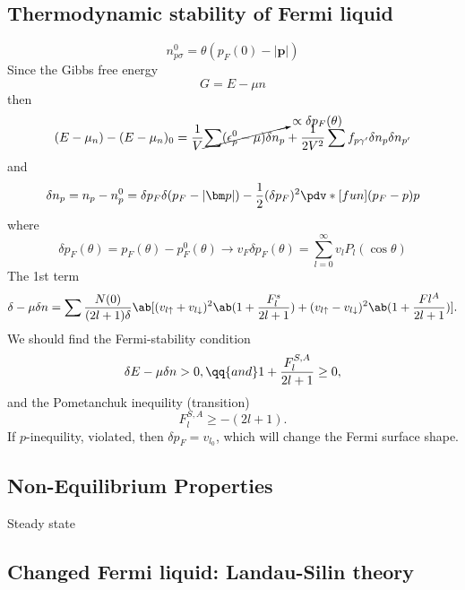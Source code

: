 \subsection{Thermodynamic stability of Fermi liquid}

\begin{equation}
  n_{p\sigma}^0 = \theta(p_F(0) - |\bm p|)
\end{equation}
Since the Gibbs free energy
\begin{equation}
  G = E - \mu n
\end{equation}
then
\begin{equation}
  (E - \mu_n) - (E - \mu_n)_0
= \frac1V \cancelto{\propto\delta p_F(\theta)}
    {\sum (\epsilon_p^0 - \mu) \delta n_p} +
  \frac1{2V^2} \sum f_{p\gamma'} \delta n_p \delta n_{p'}
\end{equation}
and
\begin{equation}
  \delta n_p = n_p - n_p^0 = \delta p_F \delta(p_F - |\bm p|)
- \frac12(\delta p_F)^2 \pdv*[fun]{(p_F - p)}p
\end{equation}
where
\[
  \delta p_F(\theta) = p_F(\theta) - p_F^0(\theta) \longrightarrow
  v_F\delta p_F(\theta) = \sum_{l=0}^\infty v_l P_l(\cos\theta)
\]
The 1st term
\[
  \delta - \mu \delta n = \sum \frac{N(0)}{(2l + 1) \delta}
  \ab[(v_{l\uparrow} + v_{l\downarrow})^2 \ab(1 + \frac{F_l^s}{2l + 1})
    + (v_{l\uparrow} - v_{l\downarrow})^2 \ab(1 + \frac{Fl^A}{2l + 1})].
\]
We should find the Fermi-stability condition
\begin{equation}
  \delta E - \mu\delta n > 0, \qq{and}
  1 + \frac{F_l^{S,A}}{2l + 1} \geq 0,
\end{equation}
and the Pometanchuk inequility (transition)
\begin{equation}
  F_l^{S,A} \geq -(2l + 1).
\end{equation}
If $p$-inequility, violated, then $\delta p_F = v_{l_0}$, which
will change the Fermi surface shape.

\subsection{Non-Equilibrium Properties}

Steady state

\subsection{Changed Fermi liquid: Landau-Silin theory}

